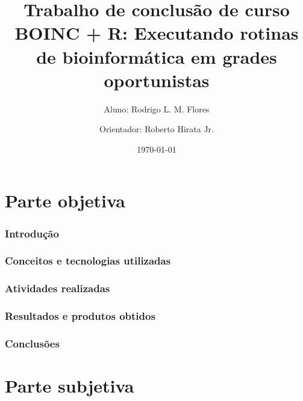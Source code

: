 \documentclass[a4paper,12pt,titlepage]{article}
\title{Trabalho de conclusão de curso \\
BOINC + R: Executando rotinas de bioinformática em grades oportunistas}
\author{Aluno: Rodrigo L. M. Flores \and
        Orientador: Roberto Hirata Jr. }
\date{\today}
\begin{document}
\maketitle

\nocite{wiki:volunteercomputing}
\nocite{wiki:interpretedlanguage}
\nocite{wiki:boinc}
\nocite{wiki:r}
\nocite{boinc_wrapper}
\nocite{hungaro}
\nocite{nytimes}

\part{Parte objetiva}

\section{Introdução}



\newpage

\section{Conceitos e tecnologias utilizadas}



\newpage

\section{Atividades realizadas}



\newpage

\section{Resultados e produtos obtidos}




\newpage

\section{Conclusões}



\newpage





\newpage


\part{Parte subjetiva}


\end{document}
